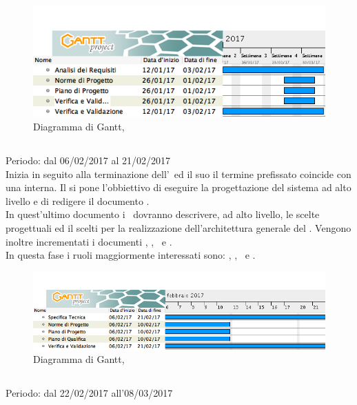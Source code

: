 \begin{figure}[H]
	\centering 
	\includegraphics[scale=0.6]{Immagini/Gantt/ARD.png}
	\caption{Diagramma di Gantt, \ARD}
\end{figure}

\subsection{\PA}
Periodo: dal 06/02/2017 al 21/02/2017 \\

Inizia in seguito alla terminazione dell'\ARD\ ed il suo il termine prefissato coincide con una  interna.
Il  si pone l'obbiettivo di eseguire la progettazione del sistema ad alto livello e di redigere il documento \ST.\\
In quest'ultimo documento i \ProgP\ dovranno descrivere, ad alto livello, le scelte progettuali ed il  scelti per la realizzazione dell'architettura generale del . Vengono inoltre incrementati i documenti \NdP, \PdP, \PdQ\ e \Gl.\\
In questa fase i ruoli maggiormente interessati sono: \Prog, \Pm, \Ver\ e \Am.

 \begin{figure}[H]
	\centering 
	\includegraphics[scale=0.6]{Immagini/Gantt/PA.png}
	\caption{Diagramma di Gantt, \PA}
\end{figure}

\subsection{\PD}
Periodo: dal 22/02/2017 all'08/03/2017\\

